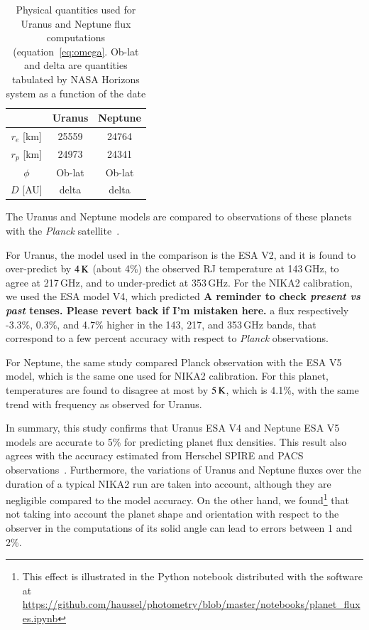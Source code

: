 \documentclass[traditionalabstract]{aa}
\newcommand{\LEt}[1]{{\bf {\color[RGB]{0, 153, 255} #1}}}
\begin{document}
{\begin{appendix}
\begin{table}[!ht]
\begin{center}
\begin{tabular}{|c|c|c|}
\hline
     & Uranus & Neptune \\
\hline
$r_{e}$ [km]  & 25559 & 24764 \\ 
\hline
$r_{p}$ [km]  & 24973 & 24341  \\
\hline
$\phi$         & Ob-lat & Ob-lat \\
\hline
$D$   [AU]    & delta   & delta \\
\hline
\end{tabular}
\end{center}
\caption[Primary calibrator flux models]{Physical quantities used for Uranus and Neptune flux
  computations (equation~\ref{eq:omega}. Ob-lat and delta are quantities 
  tabulated by NASA Horizons system as a function of the date}
\label{tab:planetphysparam}
\end{table}

The Uranus and Neptune models are compared to 
observations of these planets with the \emph{Planck}
satellite~\citep{PLCK-LII}.

For Uranus, the model used in the comparison
is the ESA V2, and it is found to over-predict by $4\,\rm{K}$ (about 4\%) the
observed RJ temperature at 143\,GHz, to agree at 217\,GHz, and
to under-predict at 353\,GHz. For the NIKA2 calibration, we used the ESA
model V4, which predicted\LEt{A reminder to check \textit{present vs past} tenses. Please revert back if I'm mistaken here.} a flux respectively -3.3\%, 0.3\%, and 4.7\% higher in the
143, 217, and 353\,GHz bands, that correspond to a few percent accuracy
with respect to \emph{Planck} observations.

For Neptune, the same study compared Planck observation with the ESA V5
model, which is the same one used for NIKA2 calibration. For this
planet, temperatures are found to disagree at most by $5\, \rm{K}$, which is 4.1\%,
with the same trend with frequency as observed for Uranus.

In summary, this study confirms that Uranus ESA V4 and Neptune ESA V5
models are accurate to 5\% for predicting planet flux densities. This
result also agrees with the accuracy estimated from Herschel SPIRE
and PACS observations~\citep{Mueller2016, Swinyard2014}. 
Furthermore, the variations of Uranus and Neptune fluxes over the duration of a typical
NIKA2 run are taken into account, although they are negligible
compared to the model accuracy. On the other hand, we
found\footnote{This effect is illustrated in the Python notebook
  distributed with the software at \url{https://github.com/haussel/photometry/blob/master/notebooks/planet_fluxes.ipynb}} that not
taking into account the planet shape and orientation with respect to
the observer in the computations of its solid angle can lead to errors
between 1 and 2\%.



\end{appendix}}
\end{document}
